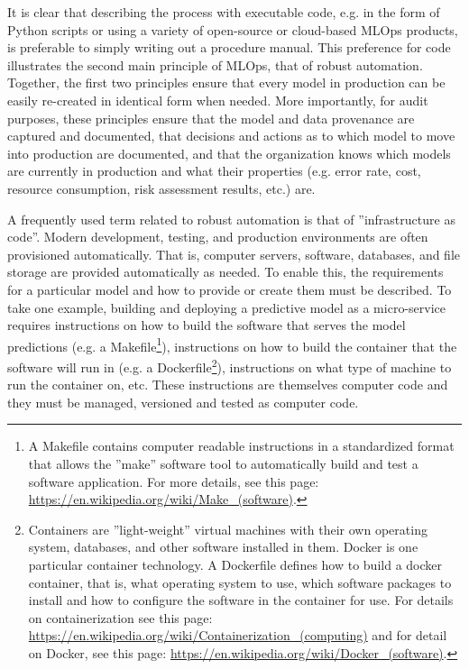 It is clear that describing the process with executable code, e.g. in the form of Python scripts or using a variety of open-source or cloud-based MLOps products, is preferable to simply writing out a procedure manual. This preference for code illustrates the second main principle of MLOps, that of robust automation. Together, the first two principles ensure that every model in production can be easily re-created in identical form when needed. More importantly, for audit purposes, these principles ensure that the model and data provenance are captured and documented, that decisions and actions as to which model to move into production are documented, and that the organization knows which models are currently in production and what their properties (e.g. error rate, cost, resource consumption, risk assessment results, etc.) are.

A frequently used term related to robust automation is that of ''infrastructure as code''. Modern development, testing, and production environments are often provisioned automatically. That is, computer servers, software, databases, and file storage are provided automatically as needed. To enable this, the requirements for a particular model and how to provide or create them must be described. To take one example, building and deploying a predictive model as a micro-service requires instructions on how to build the software that serves the model predictions (e.g. a Makefile\footnote{A Makefile contains computer readable instructions in a standardized format that allows the ''make'' software tool to automatically build and test a software application. For more details, see this page: \url{https://en.wikipedia.org/wiki/Make_(software)}.}), instructions on how to build the container that the software will run in (e.g. a Dockerfile\footnote{Containers are ''light-weight'' virtual machines with their own operating system, databases, and other software installed in them. Docker is one particular container technology. A Dockerfile defines how to build a docker container, that is, what operating system to use, which software packages to install and how to configure the software in the container for use. For details on containerization see this page: \url{https://en.wikipedia.org/wiki/Containerization_(computing)} and for detail on Docker, see this page: \url{https://en.wikipedia.org/wiki/Docker_(software)}.}), instructions on what type of machine to run the container on, etc. These instructions are themselves computer code and they must be managed, versioned and tested as computer code. 

